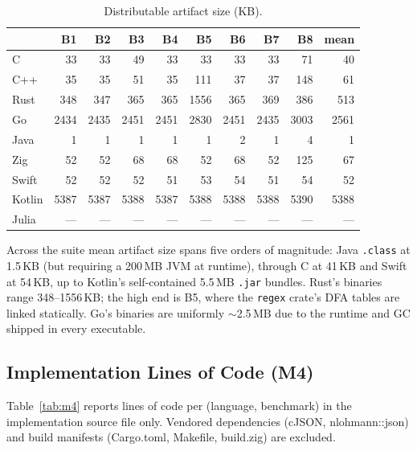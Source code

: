 \documentclass[10pt,conference]{IEEEtran}
\begin{document}
\begin{table}[t]
\caption{Distributable artifact size (KB).}
\label{tab:m3}
\centering
\small
\begin{tabular}{l*{8}{r}r}
\toprule
        & \textbf{B1} & \textbf{B2} & \textbf{B3} & \textbf{B4} & \textbf{B5} & \textbf{B6} & \textbf{B7} & \textbf{B8} & \textbf{mean} \\
\midrule
C       & 33 & 33 & 49 & 33 & 33 & 33 & 33 & 71 & 40 \\
C++     & 35 & 35 & 51 & 35 & 111 & 37 & 37 & 148 & 61 \\
Rust    & 348 & 347 & 365 & 365 & 1556 & 365 & 369 & 386 & 513 \\
Go      & 2434 & 2435 & 2451 & 2451 & 2830 & 2451 & 2435 & 3003 & 2561 \\
Java    & 1 & 1 & 1 & 1 & 1 & 2 & 1 & 4 & 1 \\
Zig     & 52 & 52 & 68 & 68 & 52 & 68 & 52 & 125 & 67 \\
Swift   & 52 & 52 & 52 & 51 & 53 & 54 & 51 & 54 & 52 \\
Kotlin  & 5387 & 5387 & 5388 & 5387 & 5388 & 5388 & 5388 & 5390 & 5388 \\
Julia   & --- & --- & --- & --- & --- & --- & --- & --- & --- \\
\bottomrule
\end{tabular}
\end{table}

Across the suite mean artifact size spans five orders of magnitude:
Java \texttt{.class} at 1.5\,KB (but requiring a 200\,MB JVM at
runtime), through C at 41\,KB and Swift at 54\,KB, up to Kotlin's
self-contained 5.5\,MB \texttt{.jar} bundles. Rust's binaries
range 348--1556\,KB; the high end is B5, where the
\texttt{regex} crate's DFA tables are linked statically. Go's
binaries are uniformly $\sim$2.5\,MB due to the runtime and GC
shipped in every executable.

\subsection{Implementation Lines of Code (M4)}
\label{sec:res-loc}

Table~\ref{tab:m4} reports lines of code per (language, benchmark)
in the implementation source file only. Vendored dependencies
(cJSON, nlohmann::json) and build manifests (Cargo.toml,
Makefile, build.zig) are excluded.
\end{document}
